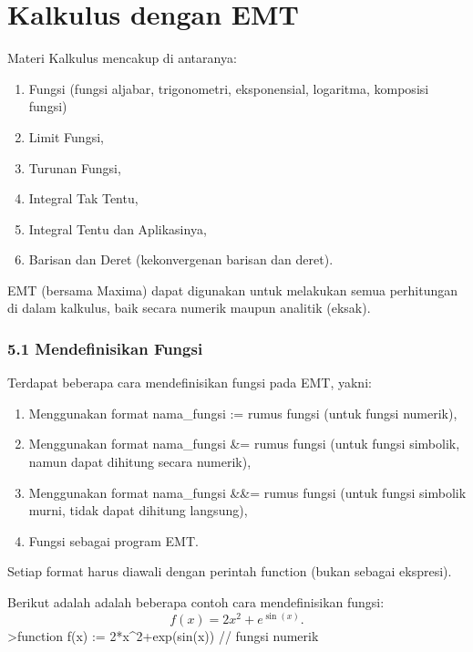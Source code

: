 \documentclass[
]{book}
\author{}
\date{}
\providecommand{\tightlist}{%
  \setlength{\itemsep}{0pt}\setlength{\parskip}{0pt}}
\begin{document}
\frontmatter

\mainmatter
\chapter{Kalkulus dengan EMT}\label{kalkulus-dengan-emt}

Materi Kalkulus mencakup di antaranya:

\begin{enumerate}
\def\labelenumi{\arabic{enumi}.}
\tightlist
\item
  Fungsi (fungsi aljabar, trigonometri, eksponensial, logaritma, komposisi fungsi)
\item
  Limit Fungsi,
\item
  Turunan Fungsi,
\item
  Integral Tak Tentu,
\item
  Integral Tentu dan Aplikasinya,
\item
  Barisan dan Deret (kekonvergenan barisan dan deret).
\end{enumerate}

EMT (bersama Maxima) dapat digunakan untuk melakukan semua perhitungan di dalam kalkulus, baik secara numerik maupun analitik (eksak).

\subsection{5.1 Mendefinisikan Fungsi}\label{mendefinisikan-fungsi}

Terdapat beberapa cara mendefinisikan fungsi pada EMT, yakni:

\begin{enumerate}
\def\labelenumi{\arabic{enumi}.}
\tightlist
\item
  Menggunakan format nama\_fungsi := rumus fungsi (untuk fungsi numerik),
\item
  Menggunakan format nama\_fungsi \&= rumus fungsi (untuk fungsi simbolik, namun dapat dihitung secara numerik),
\item
  Menggunakan format nama\_fungsi \&\&= rumus fungsi (untuk fungsi simbolik murni, tidak dapat dihitung langsung),
\item
  Fungsi sebagai program EMT.
\end{enumerate}

Setiap format harus diawali dengan perintah function (bukan sebagai ekspresi).

Berikut adalah adalah beberapa contoh cara mendefinisikan fungsi: \[f(x)=2x^2+e^{\sin(x)}.\]\textgreater function f(x) := 2*x\^{}2+exp(sin(x)) // fungsi numerik
\end{document}
